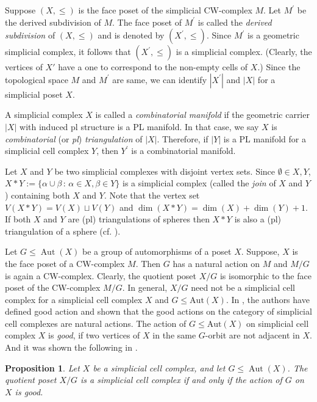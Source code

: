 \documentclass[12pt]{article}
\theoremstyle{theorem}
\newtheorem{proposition}[theorem]{Proposition}
\theoremstyle{definition}
\begin{document}
Suppose $(X, \leq)$ is the face poset of the simplicial CW-complex $M$. Let $M^{\prime}$ be the derived subdivision of $M$. The face poset of $M^{\prime}$ is called the {\it derived subdivision} of $(X,\leq)$ and is denoted by $(X^{\prime}, \leq)$. Since $M^{\prime}$ is a geometric simplicial complex, it follows that $(X^{\prime}, \leq)$ is a simplicial complex. 
(Clearly, the vertices of $X'$ have a one to correspond to the non-empty cells of $X$.)
Since the topological space $M$ and $M^{\prime}$ are same, we can identify $|X^{\prime}|$ and $|X|$ for a simplicial poset $X$.  


A simplicial complex $X$ is called a {\em combinatorial manifold} if the geometric carrier $|X|$ with induced pl structure is a PL manifold. In that case, we say $X$ is {\em combinatorial} (or {\em pl}) {\em triangulation} of $|X|$. Therefore, if $|Y|$ is a PL manifold for a simplicial cell complex $Y$, then $Y^{\prime}$ is a combinatorial manifold. 

Let $X$ and $Y$ be two simplicial complexes with disjoint vertex sets. Since $\emptyset\in X, Y$,  $X\ast Y := \{\alpha\cup\beta\, :\, \alpha\in X, \beta\in Y\}$ is a simplicial complex (called the {\em join} of $X$ and $Y$) containing both $X$ and $Y$. Note that the vertex set $V(X\ast Y) = V(X) \sqcup V(Y)$ and $\dim(X\ast Y) = \dim(X) + \dim(Y) +1$. If both $X$ and $Y$ are (pl) triangulations of spheres then $X\ast Y$ is also a (pl) triangulation of a sphere (cf. \cite{RS82}). 

Let $G \leq \operatorname{Aut}(X)$ be a group of automorphisms of a poset $X$. Suppose, $X$ is the face poset of a CW-complex $M$. Then $G$ has a natural action on $M$ and $M/G$ is again a CW-complex. Clearly, the quotient poset $X/G$ is isomorphic to the face poset of the CW-complex $M/G$. In general, $X/G$ need not be a simplicial cell complex for a simplicial cell complex $X$ and $G\leq \mbox{Aut}(X)$. In \cite{DS26}, the authors have defined good action and shown that the good actions on the category of simplicial cell complexes are natural actions. The action of $G\leq \mbox{Aut}(X)$ on simplicial cell complex $X$ is {\em good}, if two vertices of $X$ in the same $G$-orbit are not adjacent in $X$. And it was  shown  the following in \cite{DS26}. 

\begin{proposition} \label{prop:quotient}
Let $X$ be a simplicial cell complex, and let $G \leq \operatorname{Aut}(X)$. 
The quotient poset $X/G$ is a simplicial cell complex if and only if the action of $G$ on $X$ is good. 
\end{proposition}
\end{document}
